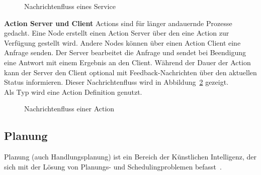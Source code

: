 \begin{figure}[ht!]
    \centering
    \caption{Nachrichtenfluss eines Service}
    \label{fig:service}
\end{figure}
\textbf{Action Server und Client} Actions sind für länger andauernde Prozesse gedacht.
Eine Node erstellt einen Action Server über den eine Action zur Verfügung gestellt wird.
Andere Nodes können über einen Action Client eine Anfrage senden.
Der Server bearbeitet die Anfrage und sendet bei Beendigung eine Antwort mit einem Ergebnis an den Client.
Während der Dauer der Action kann der Server den Client optional mit Feedback-Nachrichten über den aktuellen Status informieren.
Dieser Nachrichtenfluss wird in Abbildung~\ref{fig:action} gezeigt.\\
Als Typ wird eine Action Definition genutzt.\\
\begin{figure}[ht!]
    \centering
    \caption{Nachrichtenfluss einer Action}
    \label{fig:action}
\end{figure}
\subsection {Planung}
Planung (auch Handlungsplanung) ist ein Bereich der Künstlichen Intelligenz, der sich mit der Lösung von Planungs- und Schedulingproblemen befasst~\cite{aiplanning}.
